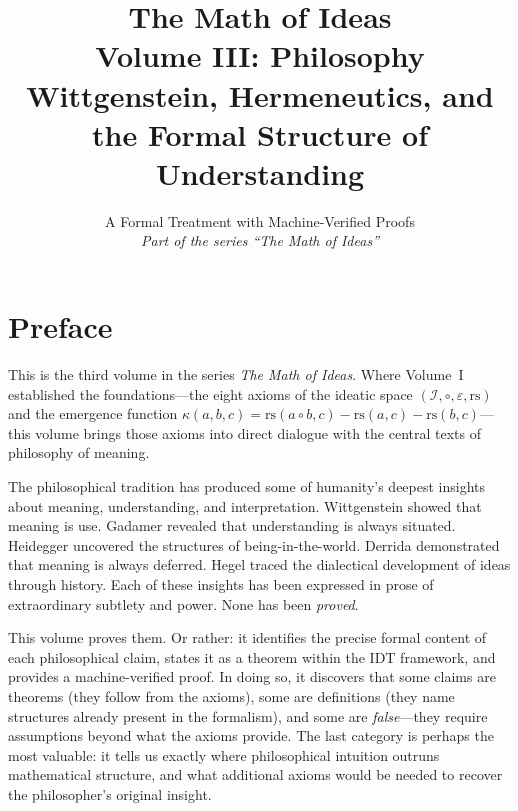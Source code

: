 \documentclass[11pt,oneside]{book}
\title{\Huge\bfseries The Math of Ideas\\[0.3em]
\LARGE Volume III: Philosophy\\[0.5em]
\Large Wittgenstein, Hermeneutics, and the Formal Structure of Understanding}
\author{A Formal Treatment with Machine-Verified Proofs\\[0.3em]
\normalsize\textit{Part of the series ``The Math of Ideas''}}
\date{}
\theoremstyle{plain}
\theoremstyle{definition}
\theoremstyle{remark}
\newcommand{\rs}{\mathrm{rs}}
\newcommand{\emerge}{\kappa}
\newcommand{\compose}{\circ}
\newcommand{\void}{\varepsilon}
\newcommand{\IS}{\mathcal{I}}
\begin{document}
\maketitle

\frontmatter

\chapter*{Preface}

This is the third volume in the series \emph{The Math of Ideas}. Where Volume~I
established the foundations---the eight axioms of the ideatic space
$(\IS, \compose, \void, \rs)$ and the emergence function
$\emerge(a,b,c) = \rs(a \compose b, c) - \rs(a,c) - \rs(b,c)$---this volume
brings those axioms into direct dialogue with the central texts of
philosophy of meaning.

The philosophical tradition has produced some of humanity's deepest insights
about meaning, understanding, and interpretation. Wittgenstein showed that
meaning is use. Gadamer revealed that understanding is always situated.
Heidegger uncovered the structures of being-in-the-world. Derrida demonstrated
that meaning is always deferred. Hegel traced the dialectical development of
ideas through history. Each of these insights has been expressed in prose
of extraordinary subtlety and power. None has been \emph{proved}.

This volume proves them. Or rather: it identifies the precise formal content of
each philosophical claim, states it as a theorem within the IDT framework,
and provides a machine-verified proof. In doing so, it discovers that some
claims are theorems (they follow from the axioms), some are definitions
(they name structures already present in the formalism), and some are
\emph{false}---they require assumptions beyond what the axioms provide.
The last category is perhaps the most valuable: it tells us exactly where
philosophical intuition outruns mathematical structure, and what additional
axioms would be needed to recover the philosopher's original insight.
\end{document}
